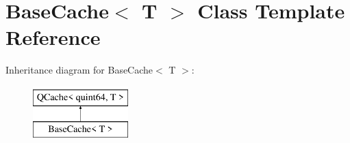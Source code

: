 \hypertarget{class_base_cache}{}\section{Base\+Cache$<$ T $>$ Class Template Reference}
\label{class_base_cache}
Inheritance diagram for Base\+Cache$<$ T $>$\+:\begin{figure}[H]
\begin{center}
\leavevmode
\includegraphics[height=2.000000cm]{class_base_cache}
\end{center}
\end{figure}
